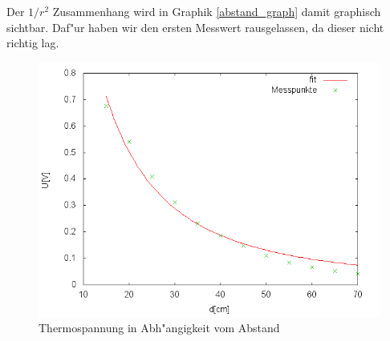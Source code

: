 	Der $1/r^2$ Zusammenhang wird in Graphik \eqref{abstand_graph} damit graphisch sichtbar. Daf"ur haben wir den ersten Messwert rausgelassen, da dieser nicht richtig lag.

	\begin{figure}[htbp]
		\centering
		\includegraphics[width = 12cm]{img/abstand.png}
		\caption{Thermospannung in Abh"angigkeit vom Abstand}
		\label{abstand_graph}
	\end{figure}

	
